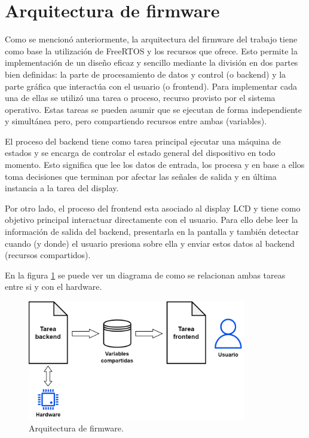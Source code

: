 \section{Arquitectura de firmware}

Como se mencionó anteriormente, la arquitectura del firmware del trabajo tiene como base la utilización de FreeRTOS y los recursos que ofrece. Esto permite la implementación de un diseño eficaz y sencillo mediante la división en dos partes bien definidas: la parte de procesamiento de datos y control (o backend) y la parte gráfica que interactúa con el usuario (o frontend). Para implementar cada una de ellas se utilizó una tarea o proceso, recurso provisto por el sistema operativo. Estas tareas se pueden asumir que se ejecutan de forma independiente y simultánea pero, pero compartiendo recursos entre ambas (variables).

El proceso del backend tiene como tarea principal ejecutar una máquina de estados y se encarga de controlar el estado general del dispositivo en todo momento. Esto significa que lee los datos de entrada, los procesa y en base a ellos toma decisiones que terminan por afectar las señales de salida y en última instancia a la tarea del display.

Por otro lado, el proceso del frontend esta asociado al display LCD y tiene como objetivo principal interactuar directamente con el usuario. Para ello debe leer la información de salida del backend, presentarla en la pantalla y también detectar cuando (y donde) el usuario presiona sobre ella y enviar estos datos al backend (recursos compartidos). 

En la figura \ref{fig:arqFW} se puede ver un diagrama de como se relacionan ambas tareas entre si y con el hardware.

\begin{figure}[H]
\centering
\includegraphics[width=0.85\textwidth]{./Figures/arqFW.png}
\caption{Arquitectura de firmware.}
\label{fig:arqFW}
\end{figure}

